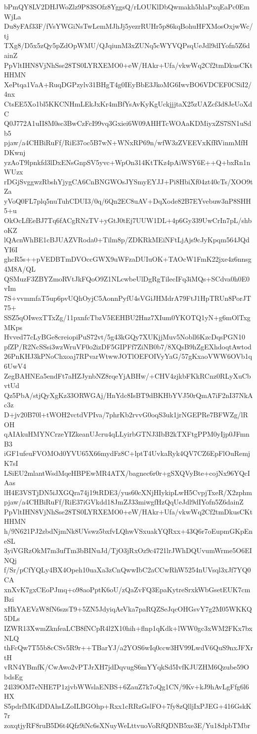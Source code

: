 bPmQY8LV2DHJWoZlz9P83SOfz8YggsQ/rLOUKlDbQwmakh5hlaPxqEaPc0EmWjLa
Du8yFAf33F/fVsYWGiNsTwLemMJhJj5yezrRUHr5p86kqBohuHFXMosOxjwWc/tj
TXg8/D5x5zQy5pZdOpWMU/QJqiunM3xZUNq5cWYVQPsqUeJdl9dIYofn5Z6dainZ
PpVltIHN8VjNhSse28TS0LYRXEMO0+eW/HAkr+Ufa/vkwWq2Cf2tmDkusCKtHHMN
XePtqa1VaA+RuqDGPzylv31BHgT4g0IEyBbE3JkoMG6IwvBO6VDCEF0CSiI2/4nx
CtsEE5Xo1bl5KKCNHmLEkJxKr4mBfYsAvKyKgUckjjjtaX25zUAZcf3d8JeUoXdC
Q0J772A1uII8M0sc3BwCzFcI99vq3Gxiei6W09AHHTcWOAaKDMiyxZS7SN1uSdb5
pjaw/a4CHBiRuFf/RiE37oc5B7wN+WNxRP69n/wfW3zZVEEVxKfRVinmMfHDKwnj
yzAoT9lpnkfd3lDxENsGnpSV5yvc+WpOn314KtTKz4pAiWSY6E++Q+bxRn1nWUzx
rDGjSvggwzRbshYjygCA6CnBNGWOsJYSmyEYJJ+Pi8HbiXf04zt40cTs/XOO9tZa
yVoQ0FL7plq5nuTuhCDUI3/0q/6Qn2EC8uAV+DqXode82B7EYvebuw3nP8SHH5+u
OkOcLfEeBJ7Tq6fACgRNzTV+yGtJ0tEj7UUW1DL+4p6Gy339UwCrIn7pL/shboKZ
lQAcnWhBE1cBJUAZVRoda0+Tilm8p/ZDKRkMEiNFtLjAjs9cJyKpqm564JQdYI6I
ghcR5s++pVEDBTmDVOccGWX9uWFzaDUIuOK+TAOcW1FmK22jxe4z6nnsg4M8A/QL
QSMuzF3ZBYZmoRVtJkFQoO9Z1NLcwbeUlDgRgTilecIFq3iMQs+SCdva0h0E0vIm
7S+vvmmfaT5up6pvUQhOyjC5AonnPyfU4sVGiJHMdrA79FtJ1HpTRUn8PorJT75+
SSZ5qOIwexTTxZg/11pxnfcTbzV5EEHBU2Hnz7XIum0YKOTQ1yN+g6mOlTxgMKps
Hvved77cLyBGe8creiopiPuS72vt/5g43kGQy7XUKjjMuv5Nobll6KzcDqsPGN10
pfZP/R2NcSSsi3wzWruVF0o2izDF5GIPFf7ZiNB0b7/8XQsB9hZgEXhdoqtAwtod
26PnKHJ3kPNoChxoaj7RPvarWtwwJOTlOEFOIVyYaG/57gKxaoVWW6OVb1q6UwV4
ZegBAHNEa5endFt7aHZJynbNZ8rqeYjABHw/+CHV4zjkbFKkRCnz0RLyXuCbvtUd
Qz5PbA/stjQyXgKz33ORWGAj/HnYdc8IsBT9dBKHbYVJ50rQmA7iF2nI37NkAc3z
D+jv20B70l+tWOH2vctdVPIva/7phrKb2rvvG0oqS3uk1jrNGEPRe7BFWZg/lROH
qAIAkuHMYNCrzeYIZkeanUJcru4qLLyirbGTNJ3IbB2kTXFtgPPM0yIjp0JFmnB3
iGF1ufeuFVOMOd0YVU65X66mydFz8C+lptT4UvkaRyk4QV7CZ6EpFlOuRemjK7sI
LSiEU2mlantWsdMqeHBPEwMR4ATX/bagnec6r0r+gSXQVyBte+cojNx96YQcIAas
lH4E3VSTjDN5iJXGQra74j19tRDE3/yus60cXNjHIykipLwH5CvpjTxeR/X2zphm
pjaw/a4CHBiRuFf/RiE37iGVkdd18JmZJ33miwgfHzQqUeJdl9dIYofn5Z6dainZ
PpVltIHN8VjNhSse28TS0LYRXEMO0+eW/HAkr+Ufa/vkwWq2Cf2tmDkusCKtHHMN
h/9N621PJ2zbdNjmNk8UVswz5bxfvLQhwVSxuakYQRxx+43Q6r7oEupmGKpEneSL
3yiVGRzOkM7m3ufTm3bBINuJd/TjO3jRxOz9c4721lrJWhDQUvumWrme5O6EINQj
f/Sr/pCfYQLy4BX4Opeh10uaXa3zCnQwwIbC2aCCwRhW5254nUVsql3xJf7YQ0CA
xnXvK7gxCEoPJmq+o98aoPptK6oU/zQaZvFQ3EpaKytreSrxkWbGsetEUK7cmBzi
xHkYAEVzW8fN6szsT9+5ZN5JdyiqAeVka7paRQZSeJqcOHGsvY7g2M05WKKQ5DLs
IZWR13XwmZknfeaLCB8fNCpR4l2X10hih+flnp1qKdk+lWW0gc3xWM2FKx7bxNLQ
thFcQw7T55b8cCSv5R9r++TBarYJ/a2YOS6wIq0ccw3HV99LwdV6QuS9nxJFXrtH
vRN4YBmfK/CwAwo2vPTJrXH7jdDqvugS6mYYqkSd5IvfKJUZHM6Qzube59ObdsEg
24l39OM7eNHE7P1zjvbWWslaENBS+6ZauZ7k7oQg1CN/9Kv+kJ9hAvLgFfg6l6HX
S5pdrfMKdDDAhsLZoILBGOhp+Rxx1cRRzGslFO+7fy8zQlljIxPJEG+416GskK7r
zoxqtjyRF8ruB5D6t4Qfz9iNc6sXNuyWeLttvuoVoRfQDNB5xe3E/Yu18dpbTMbr

